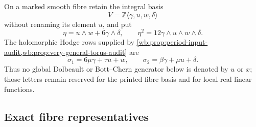 On a marked smooth fibre retain the integral basis
\[
 V=\mathbb Z\langle\gamma,u,w,\delta\rangle
\]
without renaming its element $u$, and put
\begin{equation}
 \eta=u\wedge w+6\gamma\wedge\delta,
 \qquad
 \eta^2=12\gamma\wedge u\wedge w\wedge\delta.
\label{wb:eq:bcpr-eta-square}
\end{equation}
The holomorphic Hodge rows supplied by
\cref{wb:prop:period-input-audit,wb:prop:very-general-torus-audit} are
\begin{equation}
 \sigma_1=6\mu\gamma+\tau u+w,
 \qquad
 \sigma_2=\beta\gamma+\mu u+\delta.
\label{wb:eq:bcpr-period-rows}
\end{equation}
Thus no global Dolbeault or Bott--Chern generator below is denoted by
$u$ or $x$; those letters remain reserved for the printed fibre basis and
for local real linear functions.

\subsection{Exact fibre representatives}

